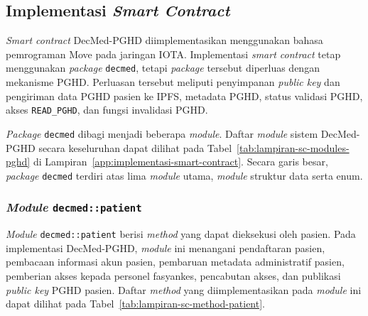 \subsection{Implementasi \textit{Smart Contract}}

 \textit{Smart contract} DecMed-PGHD diimplementasikan menggunakan bahasa pemrograman Move pada jaringan IOTA\@. 
 Implementasi \textit{smart contract} tetap menggunakan \textit{package} \texttt{decmed}, tetapi \textit{package} tersebut diperluas dengan mekanisme PGHD\@. 
 Perluasan tersebut meliputi penyimpanan \textit{public key} dan pengiriman data PGHD pasien ke IPFS, metadata PGHD, status validasi PGHD, akses \texttt{READ\_PGHD}, dan fungsi invalidasi PGHD\@.

\textit{Package} \texttt{decmed} dibagi menjadi beberapa \textit{module}. 
Daftar \textit{module} sistem DecMed-PGHD secara keseluruhan dapat dilihat pada Tabel~\ref{tab:lampiran-sc-modules-pghd} di Lampiran~\ref{app:implementasi-smart-contract}. 
Secara garis besar, \textit{package} \texttt{decmed} terdiri atas lima \textit{module} utama, \textit{module} struktur data serta enum. 




\subsubsection{\textit{Module} \texttt{decmed::patient}}\label{subsubsec:sc-module-patient}

\textit{Module} \texttt{decmed::patient} berisi \textit{method} yang dapat dieksekusi oleh pasien. 
Pada implementasi DecMed-PGHD, \textit{module} ini menangani pendaftaran pasien, pembacaan informasi akun pasien, pembaruan metadata administratif pasien, pemberian akses kepada personel fasyankes, pencabutan akses, dan publikasi \textit{public key} PGHD pasien. 
Daftar \textit{method} yang diimplementasikan pada \textit{module} ini dapat dilihat pada Tabel~\ref{tab:lampiran-sc-method-patient}.


